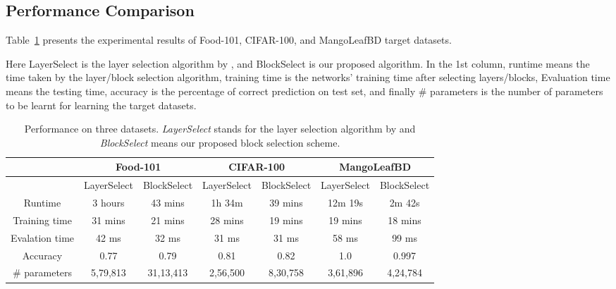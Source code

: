 \documentclass[a4paper,fleqn]{cas-sc}
\begin{document}
\subsection{Performance Comparison}
Table~\ref{tab:alldata_performance} presents the experimental results  of Food-101, CIFAR-100, and MangoLeafBD target datasets.

Here LayerSelect is the layer selection algorithm by \cite{Nagae2022}, and BlockSelect is our proposed algorithm.    In the 1st column, runtime means the time taken by the layer/block selection algorithm, training time is the networks' training time after selecting layers/blocks, Evaluation time means the testing time, accuracy is the percentage of correct prediction on test set, and finally \# parameters is the number of parameters to be learnt for learning the target datasets.

\begin{table}[width=\linewidth,cols=4,pos=h]
\caption{Performance on three datasets. \emph{LayerSelect} stands for the layer selection algorithm by \cite{Nagae2022} and \emph{BlockSelect} means our proposed block selection scheme.}
\label{tab:alldata_performance}
\begin{tabular*}{\tblwidth}{ c | c | c | c | c | c | c }
\toprule
& \multicolumn{2}{c|}{Food-101}  & \multicolumn{2}{c|}{CIFAR-100} & \multicolumn{2}{c}{MangoLeafBD} \\
\toprule
 & LayerSelect & BlockSelect & LayerSelect & BlockSelect & LayerSelect & BlockSelect\\
\midrule
Runtime       & 3 hours & 43 mins & 1h 34m & 39 mins & 12m 19s & 2m 42s\\
Training time     & 31 mins     & 21 mins     & 28 mins     & 19 mins     & 19 mins     & 18 mins\\
Evalation time & 42 ms & 32 ms & 31 ms & 31 ms & 58 ms & 99 ms\\
Accuracy     & 0.77    &  0.79     & 0.81    &  0.82    & 1.0    &  0.997 \\
\# parameters & 5,79,813 & 31,13,413 &  2,56,500 & 8,30,758 & 3,61,896 & 4,24,784\\
\bottomrule
\end{tabular*}
\end{table}
\end{document}
